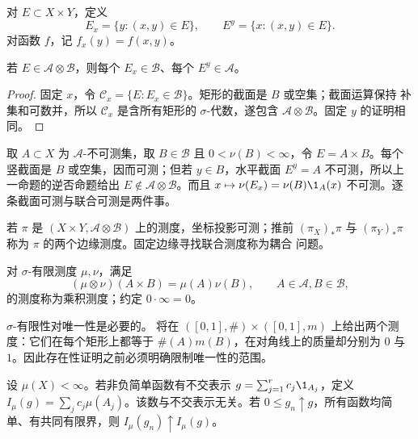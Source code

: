 \begin{definition}[截面]\label{def:2-3-2-2}
对 $E\subset X\times Y$，定义
\[
 E_x=\{y:(x,y)\in E\},\qquad E^y=\{x:(x,y)\in E\}.
\]
对函数 $f$，记 $f_x(y)=f(x,y)$。
\end{definition}

\begin{proposition}[截面可测]\label{proposition:2-3-2-1}
若 $E\in\mathcal A\otimes\mathcal B$，则每个 $E_x\in\mathcal B$、每个
$E^y\in\mathcal A$。
\end{proposition}

\begin{proof}
固定 $x$，令 $\mathcal C_x=\{E:E_x\in\mathcal B\}$。矩形的截面是 $B$ 或空集；截面运算保持
补集和可数并，所以 $\mathcal C_x$ 是含所有矩形的 $\sigma$-代数，遂包含
$\mathcal A\otimes\mathcal B$。固定 $y$ 的证明相同。
\end{proof}

\begin{example}[逐截面可测仍不够]\label{ex:2-3-2-4}
取 $A\subset X$ 为 $\mathcal A$-不可测集，取 $B\in\mathcal B$ 且
$0<\nu(B)<\infty$，令 $E=A\times B$。每个竖截面是 $B$ 或空集，因而可测；但若
$y\in B$，水平截面 $E^y=A$ 不可测，所以上一命题的逆否命题给出
$E\notin\mathcal A\otimes\mathcal B$。而且
$x\mapsto\nu(E_x)=\nu(B)\1_A(x)$ 不可测。逐条截面可测与联合可测是两件事。
\end{example}

\begin{definition}[边缘测度]\label{def:2-3-2-4}
若 $\pi$ 是 $(X\times Y,\mathcal A\otimes\mathcal B)$ 上的测度，坐标投影可测；推前
$(\pi_X)_*\pi$ 与 $(\pi_Y)_*\pi$ 称为 $\pi$ 的两个边缘测度。固定边缘寻找联合测度称为耦合
问题。
\end{definition}

\begin{definition}[乘积测度]\label{def:2-3-2-3}
对 $\sigma$-有限测度 $\mu,\nu$，满足
\[
 (\mu\otimes\nu)(A\times B)=\mu(A)\nu(B),
 \qquad A\in\mathcal A, B\in\mathcal B,
\]
的测度称为乘积测度；约定 $0\cdot\infty=0$。
\end{definition}

$\sigma$-有限性对唯一性是必要的。 将在
$([0,1],\#)\times([0,1],m)$ 上给出两个测度：它们在每个矩形上都等于
$\#(A)m(B)$，在对角线上的质量却分别为 $0$ 与 $1$。因此存在性证明之前必须明确限制唯一性的范围。

\begin{lemma}[有限简单函数的质量和]\label{lem:product-simple-section-functional}
设 $\mu(X)<\infty$。若非负简单函数有不交表示
$g=\sum_{j=1}^rc_j\1_{A_j}$，定义
$I_\mu(g)=\sum_jc_j\mu(A_j)$。该数与不交表示无关。若
$0\le g_n\uparrow g$，所有函数均简单、有共同有限界，则
$I_\mu(g_n)\uparrow I_\mu(g)$。
\end{lemma}

